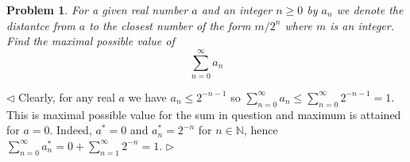 \documentclass[12pt]{article}
\newtheorem{problem}{Problem}[subsection]
\newenvironment{solution}{\par $\triangleleft$}{$\triangleright$}
\begin{document}
\begin{problem} For a given real number $a$ and an integer $n\geq 0$ by $a_n$ we
denote the distantce from $a$ to the closest number of the form $m/2^n$ where
$m$ is an integer. Find the maximal possible value of
$$
    \sum_{n=0}^\infty a_n
$$
\end{problem}
\begin{solution} Clearly, for any real $a$ we have $a_n\leq 2^{-n-1}$ so
    $\sum_{n=0}^\infty a_n\leq \sum_{n=0}^\infty 2^{-n-1}=1$. This is maximal
    possible value for the sum in question and maximum is attained for $a=0$.
    Indeed, $a^*=0$ and $a_n^*=2^{-n}$ for $n\in\mathbb{N}$, hence
    $\sum_{n=0}^\infty a_n^*=0+\sum_{n=1}^\infty 2^{-n}=1$.
\end{solution}
\end{document}
